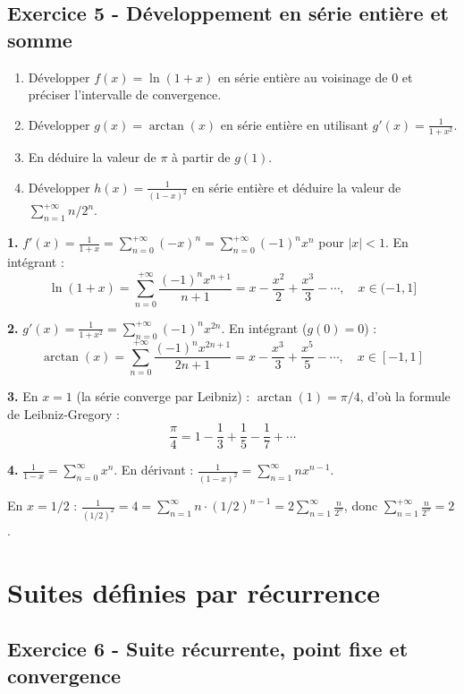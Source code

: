 \documentclass[12pt,a4paper]{article}
\begin{document}
\subsection*{Exercice 5 - Développement en série entière et somme \niveau{\difficile}}

\begin{boiteexercice}
\begin{enumerate}
  \item Développer $f(x)=\ln(1+x)$ en série entière au voisinage de 0 et préciser l'intervalle de convergence.
  \item Développer $g(x)=\arctan(x)$ en série entière en utilisant $g'(x)=\frac{1}{1+x^2}$.
  \item En déduire la valeur de $\pi$ à partir de $g(1)$.
  \item Développer $h(x)=\frac{1}{(1-x)^2}$ en série entière et déduire la valeur de $\sum_{n=1}^{+\infty}n/2^n$.
\end{enumerate}
\end{boiteexercice}

\begin{boitecorrige}
\textbf{1.} $f'(x)=\frac{1}{1+x}=\sum_{n=0}^{+\infty}(-x)^n=\sum_{n=0}^{+\infty}(-1)^n x^n$ pour $|x|<1$. En intégrant :
\[
\ln(1+x) = \sum_{n=0}^{+\infty}\frac{(-1)^n x^{n+1}}{n+1} = x-\frac{x^2}{2}+\frac{x^3}{3}-\cdots, \quad x\in(-1,1]
\]

\textbf{2.} $g'(x)=\frac{1}{1+x^2}=\sum_{n=0}^{+\infty}(-1)^n x^{2n}$. En intégrant ($g(0)=0$) :
\[
\arctan(x) = \sum_{n=0}^{+\infty}\frac{(-1)^n x^{2n+1}}{2n+1} = x-\frac{x^3}{3}+\frac{x^5}{5}-\cdots, \quad x\in[-1,1]
\]

\textbf{3.} En $x=1$ (la série converge par Leibniz) : $\arctan(1)=\pi/4$, d'où la formule de Leibniz-Gregory :
\[
\frac{\pi}{4} = 1-\frac{1}{3}+\frac{1}{5}-\frac{1}{7}+\cdots
\]

\textbf{4.} $\frac{1}{1-x}=\sum_{n=0}^\infty x^n$. En dérivant : $\frac{1}{(1-x)^2}=\sum_{n=1}^\infty n x^{n-1}$.

En $x=1/2$ : $\frac{1}{(1/2)^2}=4=\sum_{n=1}^\infty n\cdot(1/2)^{n-1}=2\sum_{n=1}^\infty\frac{n}{2^n}$, donc $\displaystyle\sum_{n=1}^{+\infty}\frac{n}{2^n}=2$.
\end{boitecorrige}

\section{Suites définies par récurrence}

\subsection*{Exercice 6 - Suite récurrente, point fixe et convergence \niveau{\moyen}}
\end{document}
